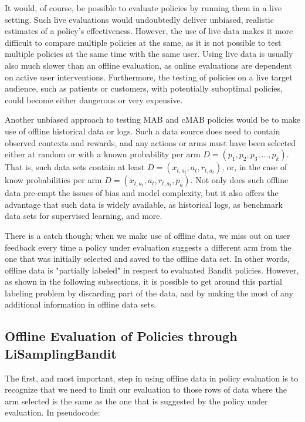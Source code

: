 \documentclass{jss}\usepackage[]{graphicx}\usepackage[]{color}
\begin{document}
It would, of course, be possible to evaluate policies by running them in a live setting. Such live evaluations would undoubtedly deliver unbiased, realistic estimates of a policy's effectiveness. However, the use of live data makes it more difficult to compare multiple policies at the same, as it is not possible to test multiple policies at the same time with the same user. Using live data is usually also much slower than an offline evaluation, as online evaluations are dependent on active user interventions. Furthermore, the testing of policies on a live target audience, such as patients or customers, with potentially suboptimal policies, could become either dangerous or very expensive.

Another unbiased approach to testing MAB and cMAB policies would be to make use of offline historical data or logs. Such a data source does need to contain observed contexts and rewards, and any actions or arms must have been selected either at random or with a known probability per arm \( D = (p_1,p_2,p_3,...,p_k) \). That is, such data sets contain at least \( D = (x_{t,a_t},a_{t},r_{t,a_t}) \), or, in the case of know probabilities per arm \( D = (x_{t,a_t},a_{t},r_{t,a_t},p_a) \). Not only does such offline data pre-empt the issues of bias and model complexity, but it also offers the advantage that such data is widely available, as historical logs, as benchmark data sets for supervised learning, and more.

There is a catch though; when we make use of offline data, we miss out on user feedback every time a policy under evaluation suggests a different arm from the one that was initially selected and saved to the offline data set. In other words, offline data is "partially labeled" in respect to evaluated Bandit policies. However, as shown in the following subsections, it is possible to get around this partial labeling problem by discarding part of the data, and by making the most of any additional information in offline data sets.

\subsection{Offline Evaluation of Policies through LiSamplingBandit}

The first, and most important, step in using offline data in policy evaluation is to recognize that we need to limit our evaluation to those rows of data where the arm selected is the same as the one that is suggested by the policy under evaluation. In pseudocode:
\end{document}

